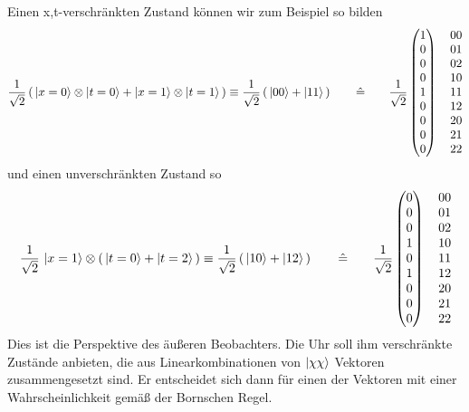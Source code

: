 \documentclass[12pt]{article}
\begin{document}
Einen x,t-verschränkten Zustand können wir zum Beispiel so bilden
\begin{equation*}
\frac{1}{\sqrt{2}} \left(\, \ket{x=0}\otimes\ket{t=0} + \ket{x=1}\otimes\ket{t=1} \,\right) \equiv 
\frac{1}{\sqrt{2}} \left(\, \ket{00} + \ket{11} \,\right)
\quad\quad\hat{=}\quad\quad
\frac{1}{\sqrt{2}}
\begin{pmatrix}
1 \\ 0 \\ 0 \\ 0 \\ 1 \\ 0 \\ 0 \\ 0 \\ 0 
\end{pmatrix}
\quad
\begin{matrix}
00 \\ 01 \\ 02 \\ 10 \\ 11 \\ 12 \\ 20 \\ 21 \\ 22 
\end{matrix}
\end{equation*}
und einen unverschränkten Zustand so
\begin{equation*}
\frac{1}{\sqrt{2}}\, \ket{x=1}\otimes \left(\,\ket{t=0} + \ket{t=2} \,\right) \equiv 
\frac{1}{\sqrt{2}} \left(\, \ket{10} + \ket{12} \,\right)
\quad\quad\hat{=}\quad\quad
\frac{1}{\sqrt{2}}
\begin{pmatrix}
0 \\ 0 \\ 0 \\ 1 \\ 0 \\ 1 \\ 0 \\ 0 \\ 0 
\end{pmatrix}
\quad
\begin{matrix}
00 \\ 01 \\ 02 \\ 10 \\ 11 \\ 12 \\ 20 \\ 21 \\ 22 
\end{matrix}
\end{equation*}
Dies ist die Perspektive des äußeren Beobachters. Die Uhr soll ihm verschränkte Zustände anbieten, die aus Linearkombinationen von $\ket{\chi\chi}$ Vektoren zusammengesetzt sind. Er entscheidet sich dann für einen der Vektoren mit einer Wahrscheinlichkeit gemäß der Bornschen Regel. 
\end{document}
